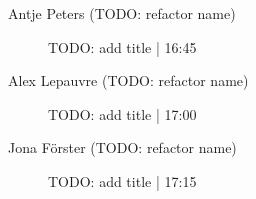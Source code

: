 \begin{symposium}
\begin{description}
                \item [Antje Peters  (TODO: refactor name)] TODO: add title \textcolor{mygray}{ | 16:45}    
                
                \item [Alex Lepauvre (TODO: refactor name)] TODO: add title \textcolor{mygray}{ | 17:00}    
                
                \item [Jona Förster (TODO: refactor name)] TODO: add title \textcolor{mygray}{ | 17:15}    
                
            \end{description} 
            \end{symposium}
            